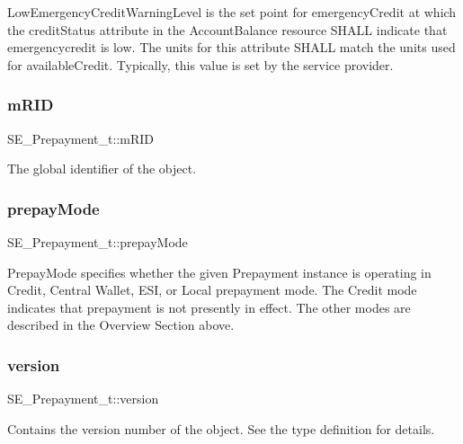 Low\+Emergency\+Credit\+Warning\+Level is the set point for emergency\+Credit at which the credit\+Status attribute in the Account\+Balance resource S\+H\+A\+LL indicate that emergencycredit is low. The units for this attribute S\+H\+A\+LL match the units used for available\+Credit. Typically, this value is set by the service provider. \mbox{\label{group__Prepayment_gaffa073447cfffd53adc271415a6cc365}} 
\subsubsection{\texorpdfstring{m\+R\+ID}{mRID}}
{\footnotesize\ttfamily S\+E\+\_\+\+Prepayment\+\_\+t\+::m\+R\+ID}

The global identifier of the object. \mbox{\label{group__Prepayment_gaa405ffaa7f1ebe0ebdaf55b747dcf629}} 
\subsubsection{\texorpdfstring{prepay\+Mode}{prepayMode}}
{\footnotesize\ttfamily S\+E\+\_\+\+Prepayment\+\_\+t\+::prepay\+Mode}

Prepay\+Mode specifies whether the given Prepayment instance is operating in Credit, Central Wallet, E\+SI, or Local prepayment mode. The Credit mode indicates that prepayment is not presently in effect. The other modes are described in the Overview Section above. \mbox{\label{group__Prepayment_ga5eeb01e55108aff758d1ca928fe9172a}} 
\subsubsection{\texorpdfstring{version}{version}}
{\footnotesize\ttfamily S\+E\+\_\+\+Prepayment\+\_\+t\+::version}

Contains the version number of the object. See the type definition for details. 